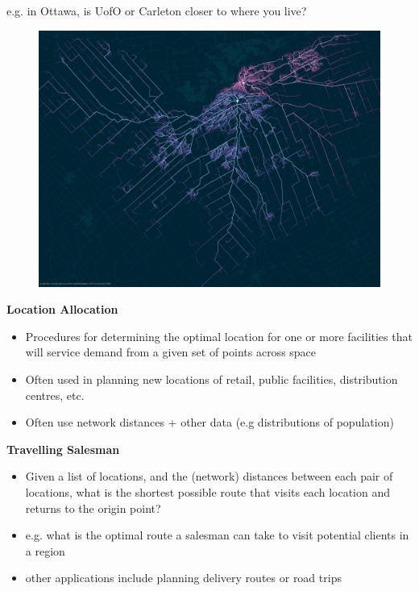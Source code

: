 \documentclass[aspectratio=169]{beamer}
\begin{document}
\begin{frame}
	
	e.g. in Ottawa, is UofO or Carleton closer to where you live?
	
	\begin{figure}
		\centering
		\includegraphics[width=0.79\linewidth]{images/ottawa_2c.png}
	\end{figure}
	\tiny \url{}
\end{frame}





\begin{frame}

	
	\textbf{Location Allocation}
	\begin{itemize}
		\item Procedures for determining the optimal location for one or more facilities that will service demand from a given set of points across space
		\item Often used in planning new locations of retail, public facilities, distribution centres, etc.
		\item Often use network distances + other data (e.g distributions of population)
	\end{itemize}
	
\end{frame}





\begin{frame}

	
	\textbf{Travelling Salesman}
	
	\begin{itemize}
		\item 	Given a list of locations, and the (network) distances between each pair of locations, what is the shortest possible route that visits each location and returns to the origin point?
		\item e.g. what is the optimal route a salesman can take to visit potential clients in a region 
		\item other applications include planning delivery routes or road trips
	\end{itemize}
	
\end{frame}
\end{document}
